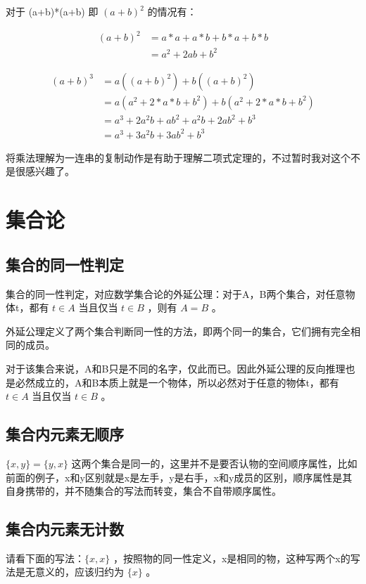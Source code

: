 \documentclass[12pt,oneside]{book}
\begin{document}
对于 (a+b)*(a+b) 即 $(a+b)^2$ 的情况有：

\begin{align*}
(a+b)^2 &= a*a + a*b + b*a + b*b\\
    &=a^2 + 2ab + b^2 
\end{align*}



\begin{align*}
(a+b)^3 &= a((a+b)^2) + b((a+b)^2)\\
    &=a(a^2 + 2 * a * b + b^2 )  + b(a^2 + 2 * a * b + b^2 )\\
    &=a^3 + 2a^2b + ab^2 + a^2b + 2ab^2 + b^3\\
    &=a^3 + 3a^2b + 3ab^2 + b^3
\end{align*}

将乘法理解为一连串的复制动作是有助于理解二项式定理的，不过暂时我对这个不是很感兴趣了。












\chapter{集合论}
\section{集合的同一性判定}
集合的同一性判定，对应数学集合论的外延公理：对于A，B两个集合，对任意物体t，都有 $t \in A$ 当且仅当 $t \in B$ ，则有 $A=B$ 。

外延公理定义了两个集合判断同一性的方法，即两个同一的集合，它们拥有完全相同的成员。

对于该集合来说，A和B只是不同的名字，仅此而已。因此外延公理的反向推理也是必然成立的，A和B本质上就是一个物体，所以必然对于任意的物体t，都有 $t \in A$ 当且仅当 $t \in B$ 。


\section{集合内元素无顺序}
$\{x, y\} =\{y, x\}$ 这两个集合是同一的，这里并不是要否认物的空间顺序属性，比如前面的例子，x和y区别就是x是左手，y是右手，x和y成员的区别，顺序属性是其自身携带的，并不随集合的写法而转变，集合不自带顺序属性。

\section{集合内元素无计数}
请看下面的写法：$\{x, x\}$ ，按照物的同一性定义，x是相同的物，这种写两个x的写法是无意义的，应该归约为 $\{x\}$ 。
\end{document}
